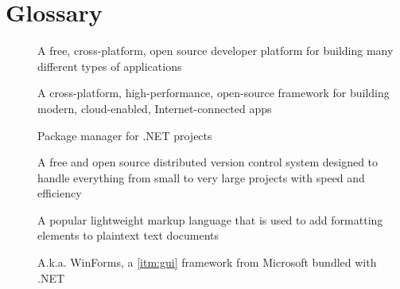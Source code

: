 \chapter*{Glossary}

\begin{description}
    \item [] A free, cross-platform, open source developer platform for building many different types of applications \cite{microsoft_what_2022}
    \item [] A cross-platform, high-performance, open-source framework for building modern, cloud-enabled, Internet-connected apps \cite{rick-anderson_overview_2022}
    \item [] Package manager for .NET projects \cite{microsoft_nuget_2022}
    \item [] A free and open source distributed version control system designed to handle everything from small to very large projects with speed and efficiency \cite{git_git_2022}
    \item [] A popular lightweight markup language that is used to add formatting elements to plaintext text documents \cite{cone_getting_2022}
    \item [] A.k.a. WinForms, a \ref{itm:gui} framework from Microsoft bundled with .NET
\end{description}